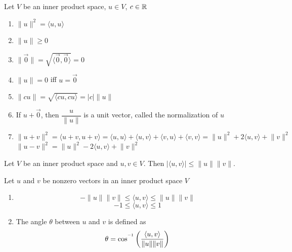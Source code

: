 \begin{remark}
Let $V$ be an inner product space, $u \in V$, $c \in \mathbb{R}$
\begin{enumerate}
    \item $\lVert u \rVert^2 = \langle u, u \rangle$
    \item $\lVert u \rVert \geq 0$
    \item $\lVert \vec{0} \rVert = \sqrt{\langle \vec{0}, \vec{0} \rangle} = 0$
    \item $\lVert u \rVert = 0$ iff $u = \vec{0}$
    \item $\lVert cu \rVert = \sqrt{\langle cu, cu \rangle} = \lvert c \rvert \lVert u \rVert$
    \item If $u + \vec{0}$, then $\dfrac{u}{\lVert u \rVert}$ is a unit vector, called the normalization of $u$
    \item $\lVert u + v \rVert^2 = \langle u + v, u + v \rangle = \langle u, u \rangle + \langle u, v \rangle + \langle v, u \rangle + \langle v, v \rangle =\lVert u \rVert^2 + 2\langle u, v \rangle + \lVert v \rVert^2$ \\
    $\lVert u - v \rVert^2 = \lVert u \rVert^2 - 2 \langle u, v \rangle + \lVert v \rVert^2$
\end{enumerate}
\end{remark}

\begin{theorem}
Let $V$ be an inner product space and $u, v \in V$. Then $\lvert \langle u, v \rangle \rvert \leq \lVert u \rVert \lVert v \rVert$.
\end{theorem}

\begin{remark}
Let $u$ and $v$ be nonzero vectors in an inner product space $V$
\begin{enumerate}
    \item $$-\lVert u \rVert \lVert v \rVert \leq \langle u, v \rangle \leq \lVert u \rVert \lVert v \rVert$$
    $$-1 \leq \langle u, v \rangle \leq 1$$
    \item The angle $\theta$ between $u$ and $v$ is defined as 
    $$\theta = \cos^{^{-1}}\left(\frac{\langle u, v \rangle}{\lVert u \rVert \lVert v \rVert}\right)$$
\end{enumerate}
\end{remark}

